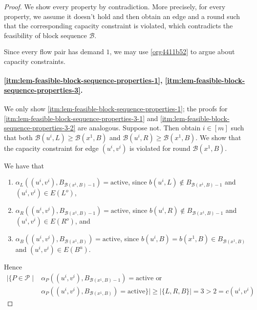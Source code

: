 \documentclass[fontsize=11pt,paper=a4]{book}
\begin{document}
\begin{proof}
We show every property by contradiction.
More precisely, for every property, we assume it doesn't hold and then obtain an edge and a round such that the corresponding capacity constraint is violated, which contradicts the feasibility of block sequence \(\mathcal{B}\).

Since every flow pair has demand \(1\), we may use \ref{org4411b52} to argue about capacity constraints.

\paragraph{\ref{itm:lem-feasible-block-sequence-properties-1}, \ref{itm:lem-feasible-block-sequence-properties-3}.}
We only show \ref{itm:lem-feasible-block-sequence-properties-1}; the proofs for \ref{itm:lem-feasible-block-sequence-properties-3-1} and \ref{itm:lem-feasible-block-sequence-properties-3-2} are analogous.
Suppose not.
Then obtain \(i\in[m]\) such that both \(\mathcal{B}(u^i,L)\geq\mathcal{B}(x^1,B)\) and \(\mathcal{B}(u^i,R)\geq\mathcal{B}(x^1,B)\).
We show that the capacity constraint for edge \((u^i,v^i)\) is violated for round \(\mathcal{B}(x^1,B)\).

We have that

\begin{enumerate}
\item \(\alpha_L((u^i,v^i),B_{\mathcal{B}(x^1,B)-1})=\mathrm{active}\), since \(b(u^i,L)\notin B_{\mathcal{B}(x^1,B)-1}\) and \((u^i,v^i)\in E(L^o)\),

\item \(\alpha_R((u^i,v^i),B_{\mathcal{B}(x^1,B)-1})=\mathrm{active}\), since \(b(u^i,R)\notin B_{\mathcal{B}(x^1,B)-1}\) and \((u^i,v^i)\in E(R^o)\), and

\item \(\alpha_B((u^i,v^i),B_{\mathcal{B}(x^1,B)})=\mathrm{active}\), since \(b(u^i,B)=b(x^1,B)\in B_{\mathcal{B}(x^1,B)}\) and \((u^i,v^i)\in E(B^u)\).
\end{enumerate}

Hence
\begin{align*}
\lvert\{P\in\mathcal{P}\mid&\alpha_P((u^i,v^i),B_{\mathcal{B}(x^1,B)-1})=\mathrm{active}\text{ or }\\
&\alpha_P((u^i,v^i),B_{\mathcal{B}(x^1,B)})=\mathrm{active}\}\rvert\geq\lvert\{L,R,B\}\rvert=3>2=c(u^i,v^i)
\end{align*}


\end{proof}
\end{document}
